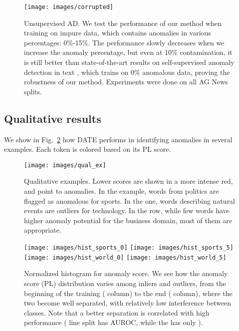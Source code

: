 \documentclass[11pt]{article}
\begin{document}
\begin{figure}[t!]
\centering
\texttt{[image: images/corrupted]}
\caption{Unsupervised AD. We test the performance of our method when training on impure data, which contains anomalies in various percentages: 0\%-15\%. The performance slowly decreases when we increase the anomaly percentage, but even at 10\% contamination, it is still better than state-of-the-art results on self-supervised anomaly detection in text \cite{acl2019}, which trains on 0\% anomalous data, proving the robustness of our method. Experiments were done on all AG News splits.}
\label{fig: fully_unsup_od}
\end{figure}

\subsection{Qualitative results}
We show in Fig.~\ref{fig: qual_ex} how DATE performs in identifying anomalies in several examples. Each token is colored based on its PL score.

\begin{figure}[t!]
\centering
\texttt{[image: images/qual\_ex]} 
\caption{Qualitative examples. Lower scores are shown in a more intense red, and point to anomalies. In the  example, words from politics are flagged as anomalous for sports. In the  one, words describing natural events are outliers for technology. In the  row, while few words have higher anomaly potential for the business domain, most of them are appropriate.}
\label{fig: qual_ex}
\end{figure}



\begin{figure}[t!]
\centering
    \texttt{[image: images/hist\_sports\_0]}
    \texttt{[image: images/hist\_sports\_5]} 
    \texttt{[image: images/hist\_world\_0]}
    \texttt{[image: images/hist\_world\_5]}
\caption{Normalized histogram for anomaly score. We see how the anomaly score (PL) distribution varies among inliers and outliers, from the beginning of the training ( column) to the end ( column), where the two become well separated, with relatively low interference between classes. Note that a better separation is correlated with high performance ( line split has  AUROC, while the  has only ).}
\label{fig: histogram}
\end{figure}
\end{document}

